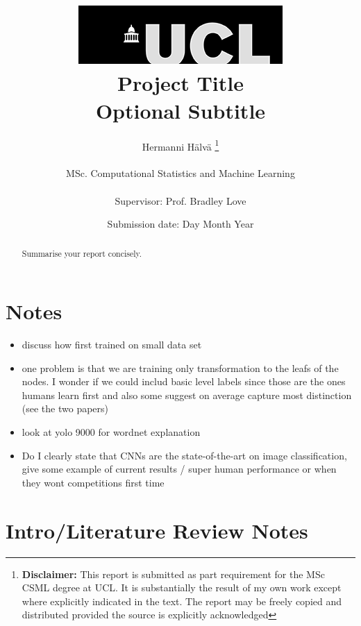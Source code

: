 \documentclass[12pt]{report}
\title{  	{ \includegraphics[scale=.5]{ucl_logo.png}}\\
{{\Huge Project Title}}\\
{\large Optional Subtitle}\\
		}
\date{Submission date: Day Month Year}
\author{Hermanni H{\"a}lv{\"a} \thanks{
{\bf Disclaimer:}
This report is submitted as part requirement for the MSc CSML degree at UCL. It is
substantially the result of my own work except where explicitly indicated in the text.
The report may be freely copied and distributed provided the source is explicitly acknowledged
\newline  %
}
\\ \\
MSc. Computational Statistics and Machine Learning\\ \\
Supervisor: Prof. Bradley Love}
\begin{document}
 
\onehalfspacing
\maketitle
\begin{abstract}
Summarise your report concisely.
\end{abstract}
\tableofcontents
\setcounter{page}{1}

\chapter{Notes}
\begin{itemize}
    \item discuss how first trained on small data set
    \item one problem is that we are training only transformation to the leafs of the nodes. I wonder if we could includ basic level labels since those are the ones humans learn first and also some suggest on average capture most distinction (see the two papers)
    \item look at yolo 9000 for wordnet explanation
    \item Do I clearly state that CNNs are the state-of-the-art on image classification, give some example of current results / super human performance or when they wont competitions first time
\end{itemize}

\chapter{Intro/Literature Review Notes}
\end{document}
